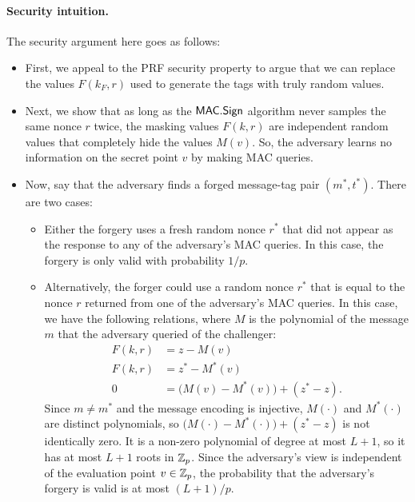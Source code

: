 \paragraph{Security intuition.}
The security argument here goes as follows:
\begin{itemize}
  \item First, we appeal to the PRF security property to argue
        that we can replace the values $F(k_F, r)$ used to generate
        the tags with truly random values.

  \item Next, we show that as long as the $\mathsf{MAC.Sign}$ algorithm never
        samples the same nonce $r$ twice, the masking values $F(k,r)$
        are independent random values that completely hide the values $M(v)$.
        So, the adversary learns no information on the secret point $v$
        by making MAC queries.

  \item Now, say that the adversary finds a forged message-tag pair $(m^*, t^*)$.
    There are two cases:
        \begin{itemize}
          \item Either the forgery uses a fresh random nonce $r^*$ that did 
            not appear as the response to any of the adversary's MAC queries.
            In this case, the forgery is only valid with probability $1/p$. 
          \item Alternatively, the forger could use a random nonce $r^*$
            that is equal to the nonce $r$ returned from one of the adversary's
            MAC queries.
            In this case, we have the following relations, where $M$ is
            the polynomial of the message $m$ that the adversary queried
            of the challenger:
            \begin{align*}
              F(k, r) &= z - M(v)\\
              F(k, r) &= z^* - M^*(v)\\
              0 &= \big(M(v) - M^*(v)\big) + (z^* - z).
            \end{align*}
            Since $m \neq m^*$ and the message encoding is injective,
            $M(\cdot)$ and $M^*(\cdot)$ are distinct polynomials, so
            $\big(M(\cdot) - M^*(\cdot)\big) + (z^* - z)$ is not identically
            zero.
            It is a non-zero polynomial of degree at most $L+1$, so it has at
            most $L+1$ roots in $\mathbb{Z}_p$.
            Since the adversary's view is independent of the evaluation
            point $v \in \mathbb{Z}_p$, the probability that the adversary's 
            forgery is valid is at most $(L+1)/p$.
        \end{itemize}


\end{itemize}
